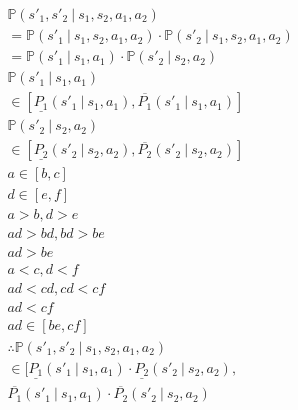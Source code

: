 \documentclass[twoside,twocolumn]{article}
\newcommand\given[1][]{\:#1\vert\:}
\begin{document}
\begin{equation}
	\begin{aligned}
	&\mathbb{P}(s'_1,s'_2 \given s_1,s_2,a_1,a_2)\\
	&=\mathbb{P}(s'_1 \given s_1,s_2,a_1,a_2) \cdot \mathbb{P}(s'_2 \given s_1,s_2,a_1,a_2)\\
	&=\mathbb{P}(s'_1 \given s_1, a_1) \cdot \mathbb{P}(s'_2 \given s_2, a_2)\\
	 &\mathbb{P}(s'_1 \given s_1, a_1)\\
	 &\in [\underline{P_1}(s'_1 \given s_1, a_1), \overline{P_1}(s'_1 \given s_1,a_1)]\\
	 &\mathbb{P}(s'_2 \given s_2, a_2)\\
	 &\in [\underline{P_2}(s'_2 \given s_2, a_2), \overline{P_2}(s'_2 \given s_2,a_2)]\\
	 &a \in [b, c]\\
	 &d \in [e, f]\\
	 &a > b, d > e\\
	 &ad > bd, bd > be\\
	 &ad > be\\
	 &a < c, d < f\\
	 &ad < cd, cd < cf\\
	 &ad < cf\\
	 &ad \in [be, cf]\\
	 &\therefore \mathbb{P}(s'_1,s'_2 \given s_1, s_2, a_1, a_2) \\
	 &\in [\underline{P_1}(s'_1 \given s_1,a_1) \cdot \underline{P_2}(s'_2 \given s_2,a_2),\\
	 & \overline{P_1}(s'_1 \given s_1, a_1) \cdot \overline{P_2}(s'_2 \given s_2, a_2)
	\end{aligned}
\end{equation}
\end{document}
